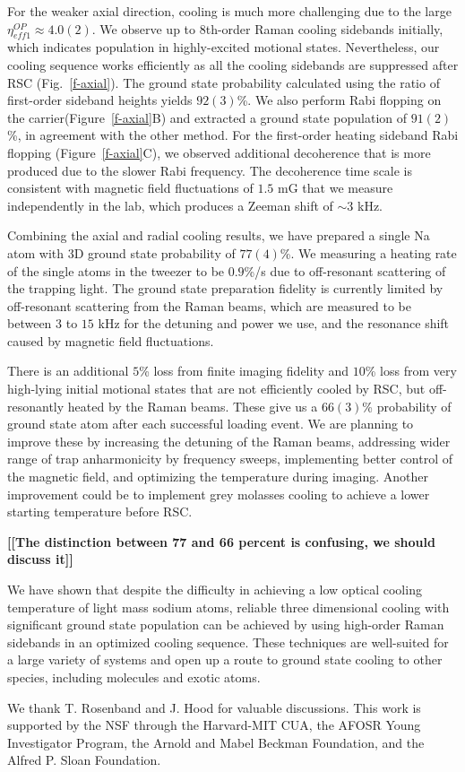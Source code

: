 \documentclass[aps,prl,twocolumn,groupedaddress]{revtex4-1}
\newcommand{\fxnote}[1]{{\textbf{[#1]}}}
\begin{document}
For the weaker axial direction, cooling is much more challenging
due to the large $\eta^{OP}_{eff1}\approx 4.0(2)$.
We observe up to 8th-order Raman cooling sidebands initially,
which indicates population in highly-excited motional states.
Nevertheless, our cooling sequence works efficiently as all the cooling sidebands are suppressed
after RSC (Fig.~\ref{f-axial}).
The ground state probability calculated using the ratio of first-order sideband heights yields
$92(3)$\%. We also perform Rabi flopping on the carrier(Figure~\ref{f-axial}B)
and extracted a ground state population of $91(2)$\%, in agreement with the other method.
For the first-order heating sideband Rabi flopping (Figure~\ref{f-axial}C),
we observed additional decoherence that is more produced due to the slower Rabi frequency.
The decoherence time scale is consistent with magnetic field fluctuations of $1.5$ mG
that we measure independently in the lab, which produces a Zeeman shift of $\sim 3$ kHz.

Combining the axial and radial cooling results,
we have prepared a single Na atom with 3D ground state probability of $77(4)$\%.
We measuring a heating rate of the single atoms in the tweezer to be $0.9$\%/s
due to off-resonant scattering of the trapping light\cite{Grimm2000}.
The ground state preparation fidelity is currently limited by off-resonant scattering
from the Raman beams,
which are measured to be between $3$ to $15$ kHz for the detuning and power we use,
and the resonance shift caused by magnetic field fluctuations.

There is an additional $5$\% loss from finite imaging fidelity and $10$\% loss from very high-lying initial motional states
that are not efficiently cooled by RSC, but off-resonantly heated by the Raman beams.  These give us a $66(3)$\% probability of ground state atom after each successful loading event.
We are planning to improve these by increasing the detuning of the Raman beams,
addressing wider range of trap anharmonicity by frequency sweeps,
implementing better control of the magnetic field, and optimizing the temperature during imaging.
Another improvement could be to implement grey molasses cooling to achieve
a lower starting temperature before RSC\cite{Colzi2016}.

\fxnote{[The distinction between 77 and 66 percent is confusing, we should discuss it]}

We have shown that despite the difficulty in achieving a low optical cooling temperature
of light mass sodium atoms, reliable three dimensional cooling
with significant ground state population can be achieved by using high-order Raman sidebands
in an optimized cooling sequence.
These techniques are well-suited for a large variety of systems
and open up a route to ground state cooling to other species, including molecules and exotic atoms.

We thank T. Rosenband and J. Hood for valuable discussions.
This work is supported by the NSF through the Harvard-MIT CUA,
the AFOSR Young Investigator Program, the Arnold and Mabel Beckman Foundation,
and the Alfred P. Sloan Foundation.


\end{document}
